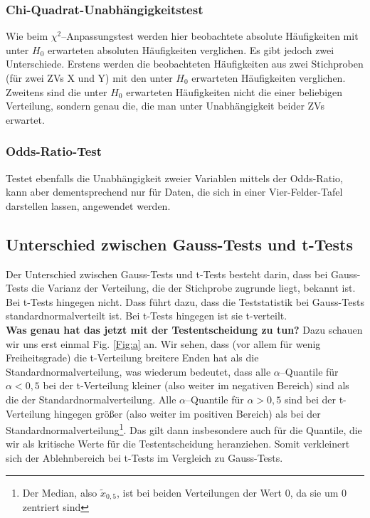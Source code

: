 \documentclass[a4paper]{article}
\begin{document}
\subsubsection{Chi-Quadrat-Unabhängigkeitstest}\label{sec:chitest2}
Wie beim $\chi^2$--Anpassungstest werden hier beobachtete absolute Häufigkeiten mit unter $H_0$ erwarteten absoluten Häufigkeiten verglichen. Es gibt jedoch zwei Unterschiede. Erstens werden die beobachteten Häufigkeiten aus zwei Stichproben (für zwei ZVs X und Y) mit den unter $H_0$ erwarteten Häufigkeiten verglichen. Zweitens sind die unter $H_0$ erwarteten Häufigkeiten nicht die einer beliebigen Verteilung, sondern genau die, die man unter Unabhängigkeit beider ZVs erwartet. %

\subsubsection{Odds-Ratio-Test}\label{sec:ORtest}
Testet ebenfalls die Unabhängigkeit zweier Variablen mittels der Odds-Ratio, kann aber dementsprechend nur für Daten, die sich in einer Vier-Felder-Tafel darstellen lassen, angewendet werden.


\subsection{Unterschied zwischen Gauss-Tests und t-Tests}\label{sec:Gaussvst}
Der Unterschied zwischen Gauss-Tests und t-Tests besteht darin, dass bei Gauss-Tests die Varianz der Verteilung, die der Stichprobe zugrunde liegt, bekannt ist. Bei t-Tests hingegen nicht. Dass führt dazu, dass die Teststatistik bei Gauss-Tests standardnormalverteilt ist. Bei t-Tests hingegen ist sie t-verteilt. \\

\noindent \textbf{Was genau hat das jetzt mit der Testentscheidung zu tun?} Dazu schauen wir uns erst einmal Fig. \ref{Fig:a} an. Wir sehen, dass (vor allem für wenig Freiheitsgrade) die t-Verteilung breitere Enden hat als die Standardnormalverteilung, was wiederum bedeutet, dass alle $\alpha$--Quantile für $\alpha < 0,5$ bei der t-Verteilung kleiner (also weiter im negativen Bereich) sind als die der Standardnormalverteilung. Alle $\alpha$--Quantile für $\alpha > 0,5$ sind bei der t-Verteilung hingegen größer (also weiter im positiven Bereich) als bei der Standardnormalverteilung\footnote{Der Median, also $\tilde{x}_{0,5}$, ist bei beiden Verteilungen der Wert 0, da sie um 0 zentriert sind}. Das gilt dann insbesondere auch für die Quantile, die wir als kritische Werte für die Testentscheidung heranziehen. Somit verkleinert sich der Ablehnbereich bei t-Tests im Vergleich zu Gauss-Tests. \\
\end{document}
